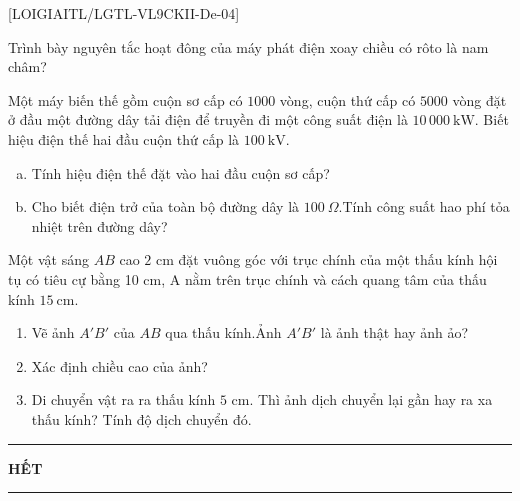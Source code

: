[LOIGIAITL/LGTL-VL9CKII-De-04]
\begin{bt}[$1{,}0$ điểm]Trình bày nguyên tắc hoạt đông của máy phát điện xoay chiều có rôto là nam châm?
	\loigiai{}
\end{bt}
\begin{bt}[$1{,}5$ điểm]Một máy biến thế gồm cuộn sơ cấp có $1000$ vòng, cuộn thứ cấp có $5000$ vòng đặt ở đầu một đường dây tải điện để truyền đi một công suất điện là $10\,000\mathrm{~kW}$. Biết hiệu điện thế hai đầu cuộn thứ cấp là $100\mathrm{~kV}$.
	\begin{enumerate}[a)]
		\item Tính hiệu điện thế đặt vào hai đầu cuộn sơ cấp?
		\item Cho biết điện trở của toàn bộ đường dây là $100~\Omega$.Tính công suất hao phí tỏa nhiệt trên đường dây?
	\end{enumerate}
	\loigiai{}
\end{bt}
\begin{bt}[$2{,}5$ điểm] Một vật sáng $AB$ cao $2$ cm đặt vuông góc với trục chính của một thấu kính hội tụ có tiêu cự bằng 10 cm, A nằm trên trục chính và cách quang tâm của thấu kính $15\mathrm{~cm}$.
	\begin{enumerate}
		\item Vẽ ảnh $A'B'$ của $AB$ qua thấu kính.Ảnh $A'B'$ là ảnh thật hay ảnh ảo?
		\item Xác định chiều cao của ảnh?
		\item Di chuyển vật ra ra thấu kính $5$ cm. Thì ảnh dịch chuyển lại gần hay ra xa thấu kính? Tính độ dịch chuyển đó.
	\end{enumerate}
	\loigiai{}
\end{bt}
\fileend
\begin{center}
	\rule[4pt]{2cm}{1pt}\large \textbf{HẾT}\rule[4pt]{2cm}{1pt}
\end{center}











